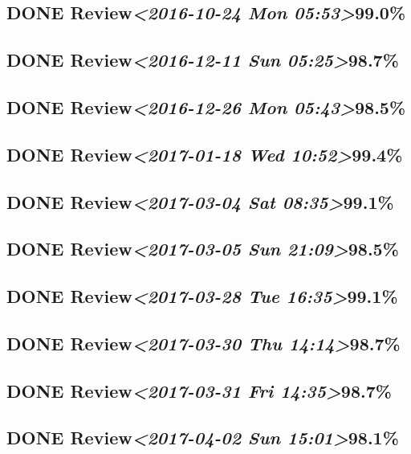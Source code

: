 \documentclass[11pt]{ctexart}
\begin{document}
\subsection{{\bfseries\sffamily DONE} Review\textit{<2016-10-24 Mon 05:53>}99.0\%}
\label{sec:org48b08f6}
\subsection{{\bfseries\sffamily DONE} Review\textit{<2016-12-11 Sun 05:25>}98.7\%}
\label{sec:org5da8933}
\subsection{{\bfseries\sffamily DONE} Review\textit{<2016-12-26 Mon 05:43>}98.5\%}
\label{sec:org7b7cd01}

\subsection{{\bfseries\sffamily DONE} Review\textit{<2017-01-18 Wed 10:52>}99.4\%}
\label{sec:org817ab06}
\subsection{{\bfseries\sffamily DONE} Review\textit{<2017-03-04 Sat 08:35>}99.1\%}
\label{sec:orge822338}
\subsection{{\bfseries\sffamily DONE} Review\textit{<2017-03-05 Sun 21:09>}98.5\%}
\label{sec:org053a45d}
\subsection{{\bfseries\sffamily DONE} Review\textit{<2017-03-28 Tue 16:35>}99.1\%}
\label{sec:orgc668a57}
\subsection{{\bfseries\sffamily DONE} Review\textit{<2017-03-30 Thu 14:14>}98.7\%}
\label{sec:orgd0613ef}
\subsection{{\bfseries\sffamily DONE} Review\textit{<2017-03-31 Fri 14:35>}98.7\%}
\label{sec:org86d8b33}

\subsection{{\bfseries\sffamily DONE} Review\textit{<2017-04-02 Sun 15:01>}98.1\%}
\label{sec:org280786a}
\end{document}
